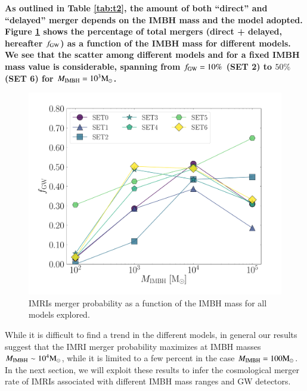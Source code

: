 \documentclass[article]{aa}
\newcommand{\Ms}{{\rm M}_\odot}
\newcommand{\ibh}{{\rm IMBH}}
\begin{document}
{\bf 
As outlined in Table \ref{tab:t2}, the amount of both ``direct'' and ``delayed'' merger depends on the IMBH mass and the model adopted. Figure \ref{fig:gwprob} shows the percentage of total mergers (direct + delayed, hereafter $f_{\rm GW}$) as a function of the IMBH mass for different models. We see that the scatter among different models and for a fixed IMBH mass value is considerable, spanning from $f_{\rm GW} = 10\%$ (SET 2) to $50 \%$ (SET 6) for $M_\ibh = 10^3\Ms$. 
\begin{figure}
\includegraphics[width=\columnwidth]{mergerprob}
    \caption{IMRIs merger probability as a function of the IMBH mass for all models explored.}
	\label{fig:gwprob}
\end{figure}

While it is difficult to find a trend in the different models, in general our results suggest that the IMRI merger probability maximizes at IMBH masses $M_\ibh\sim 10^4\Ms$, while it is limited to a few percent in the case $M_{\ibh} = 100\Ms$. In the next section, we will exploit these results to infer the cosmological merger rate of IMRIs associated with different IMBH mass ranges and GW detectors.

}
\end{document}
